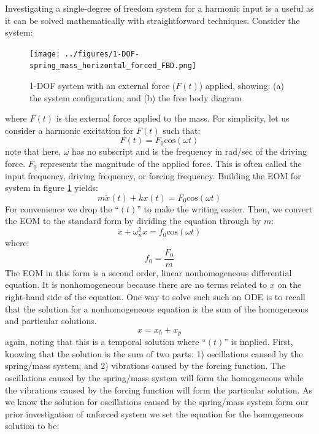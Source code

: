 \documentclass[12pt,letter]{article}
\numberwithin{ex}{section} %
\numberwithin{re}{section} %
\numberwithin{pr}{section} %
\begin{document}
		
			Investigating a single-degree of freedom system for a harmonic input is a useful as it can be solved mathematically with straightforward techniques. Consider the system:
			\begin{figure}[H]
				\centering
				\texttt{[image: ../figures/1-DOF-spring\_mass\_horizontal\_forced\_FBD.png]}
				\caption{1-DOF system with an external force ($F(t)$) applied, showing: (a) the system configuration; and (b) the free body diagram}
				\label{fig:1-DOF-spring_mass_horizontal_forced_FBD}
			\end{figure}	
			\noindent where $F(t)$ is the external force applied to the mass. For simplicity, let us consider a harmonic excitation for $F(t)$ such that:
			\begin{equation}
				F(t) = F_0\text{cos}(\omega t)
			\end{equation}							
			note that here, $\omega$ has no subscript and is the frequency in rad/sec of the driving force. $F_0$ represents the magnitude of the applied force. This is often called the input frequency, driving frequency, or forcing frequency. Building the EOM for system in figure \ref{fig:1-DOF-spring_mass_horizontal_forced_FBD} yields:
			\begin{equation}
				m \ddot{x}(t)+kx(t) = F_0\text{cos}(\omega t)
			\end{equation}			
			For convenience we drop the ``$(t)$'' to make the writing easier. Then, we convert the EOM to the standard form by dividing the equation through by $m$:					
			\begin{equation}
				\ddot{x}+\omega_n^2x = f_0\text{cos}(\omega t)
			\end{equation}					
			where:
			\begin{equation}
				f_0 = \frac{F_0}{m}
			\end{equation}	
			The EOM in this form is a second order, linear nonhomogeneous differential equation. It is nonhomogeneous because there are no terms related to $x$ on the right-hand side of the equation. One way to solve such such an ODE is to recall that the solution for a nonhomogeneous equation is the sum of the homogeneous and particular solutions. 
			\begin{equation}
				x = x_h + x_p
			\end{equation}	
			again, noting that this is a temporal solution where ``$(t)$'' is implied. First, knowing that the solution is the sum of two parts: 1) oscillations caused by the spring/mass system; and 2) vibrations caused by the forcing function. The oscillations caused by the spring/mass system will form the homogeneous while the vibrations caused by the forcing function will form the particular solution. As we know the solution for oscillations caused by the spring/mass system form our prior investigation of unforced system we set the equation for the homogeneous solution to be:
\end{document}
